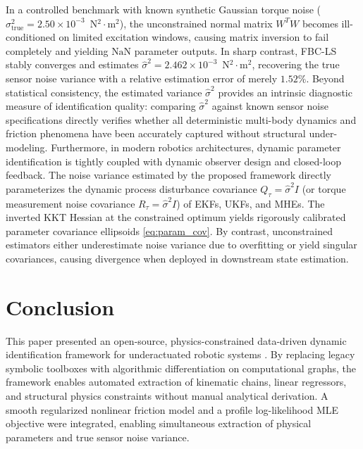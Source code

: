 \documentclass[lettersize,journal]{IEEEtran}
\begin{document}
In a controlled benchmark with known synthetic Gaussian torque noise ($\sigma^2_{\text{true}} = 2.50 \times 10^{-3}$~N$^2\cdot$m$^2$), the unconstrained normal matrix $W^T W$ becomes ill-conditioned on limited excitation windows, causing matrix inversion to fail completely and yielding $\text{NaN}$ parameter outputs. In sharp contrast, FBC-LS stably converges and estimates $\hat{\sigma}^2 = 2.462 \times 10^{-3}$~N$^2\cdot$m$^2$, recovering the true sensor noise variance with a relative estimation error of merely $1.52\%$. Beyond statistical consistency, the estimated variance $\hat{\sigma}^2$ provides an intrinsic diagnostic measure of identification quality: comparing $\hat{\sigma}^2$ against known sensor noise specifications directly verifies whether all deterministic multi-body dynamics and friction phenomena have been accurately captured without structural under-modeling. Furthermore, in modern robotics architectures, dynamic parameter identification is tightly coupled with dynamic observer design and closed-loop feedback. The noise variance estimated by the proposed framework directly parameterizes the dynamic process disturbance covariance $Q_\tau = \hat{\sigma}^2 I$ (or torque measurement noise covariance $R_\tau = \hat{\sigma}^2 I$) of EKFs, UKFs, and MHEs. The inverted KKT Hessian at the constrained optimum yields rigorously calibrated parameter covariance ellipsoids \eqref{eq:param_cov}. By contrast, unconstrained estimators either underestimate noise variance due to overfitting or yield singular covariances, causing divergence when deployed in downstream state estimation.

\section{Conclusion}
\label{sec:conclusion}
This paper presented an open-source, physics-constrained data-driven dynamic identification framework for underactuated robotic systems \cite{AskerRepo2026}. By replacing legacy symbolic toolboxes with algorithmic differentiation on computational graphs, the framework enables automated extraction of kinematic chains, linear regressors, and structural physics constraints without manual analytical derivation. A smooth regularized nonlinear friction model and a profile log-likelihood MLE objective were integrated, enabling simultaneous extraction of physical parameters and true sensor noise variance.
\end{document}
